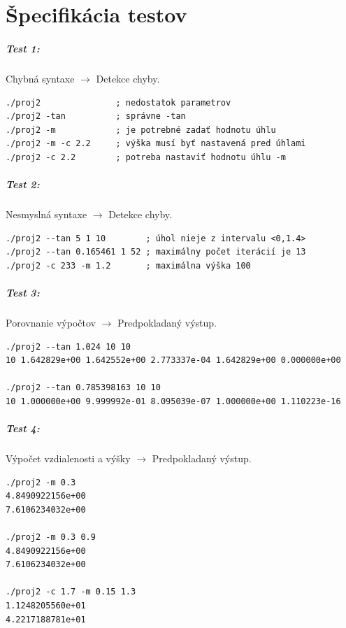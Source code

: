 \documentclass[12pt,a4paper,titlepage,final]{report}
\begin{document}
\chapter{Špecifikácia testov}

\paragraph{Test 1:} Chybná syntaxe $\longrightarrow$ Detekce chyby.
\begin{verbatim}
./proj2               ; nedostatok parametrov
./proj2 -tan          ; správne -tan
./proj2 -m            ; je potrebné zadať hodnotu úhlu
./proj2 -m -c 2.2     ; výška musí byť nastavená pred úhlami
./proj2 -c 2.2        ; potreba nastaviť hodnotu úhlu -m
\end{verbatim} 

\paragraph{Test 2:} Nesmyslná syntaxe $\longrightarrow$ Detekce chyby.
\begin{verbatim}
./proj2 --tan 5 1 10        ; úhol nieje z intervalu <0,1.4>
./proj2 --tan 0.165461 1 52 ; maximálny počet iterácií je 13
./proj2 -c 233 -m 1.2       ; maximálna výška 100
\end{verbatim} 

\paragraph{Test 3:} Porovnanie výpočtov $\longrightarrow$ Predpokladaný výstup.
\begin{verbatim}
./proj2 --tan 1.024 10 10
10 1.642829e+00 1.642552e+00 2.773337e-04 1.642829e+00 0.000000e+00

./proj2 --tan 0.785398163 10 10
10 1.000000e+00 9.999992e-01 8.095039e-07 1.000000e+00 1.110223e-16
\end{verbatim}

\paragraph{Test 4:} Výpočet vzdialenosti a výšky $\longrightarrow$ Predpokladaný výstup.
\begin{verbatim}
./proj2 -m 0.3
4.8490922156e+00
7.6106234032e+00

./proj2 -m 0.3 0.9
4.8490922156e+00
7.6106234032e+00

./proj2 -c 1.7 -m 0.15 1.3
1.1248205560e+01
4.2217188781e+01
\end{verbatim} 
\end{document}
